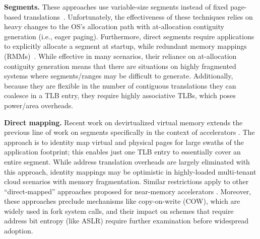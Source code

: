 \vspace{2mm}
\noindent\textbf{Segments.} These approaches use variable-size
segments instead of fixed page-based
translations~\cite{karakostas:redundant, park:hybrid,
  basu:efficient}. Unfortunately, the effectiveness of these
techniques relies on heavy changes to the OS's allocation path with
at-allocation contiguity generation (i.e., eager paging). Furthermore,
direct segments require applications to explicitly allocate a segment
at startup, while redundant memory mappings
(RMMs)~\cite{karakostas:redundant}. While effective in many scenarios,
their reliance on at-allocation contiguity generation means that there
are situations on highly fragmented systems where segments/ranges may
be difficult to generate. Additionally, because they are flexible in
the number of contiguous translations they can coalesce in a TLB
entry, they require highly associative TLBs, which poses power/area
overheads.

\vspace{2mm}
\noindent\textbf{Direct mapping.} Recent work on devirtualized
virtual memory extends the previous line of work on segments
specifically in the context of accelerators
\cite{haria:devirtualizing}. The approach is to identity map virtual
and physical pages for large swaths of the application footprint; this
enables just one TLB entry to essentially cover an entire
segment. While address translation overheads are largely eliminated
with this approach, identity mappings may be optimistic in
highly-loaded multi-tenant cloud scenarios with memory
fragmentation. Similar restrictions apply to other ``direct-mapped''
approaches proposed for near-memory accelerators
\cite{picorel:near-memory}. Moreover, these approaches preclude
mechanisms like copy-on-write (COW), which are widely used in fork
system calls, and their impact on schemes that require address bit
entropy (like ASLR) require further examination before widespread
adoption.



